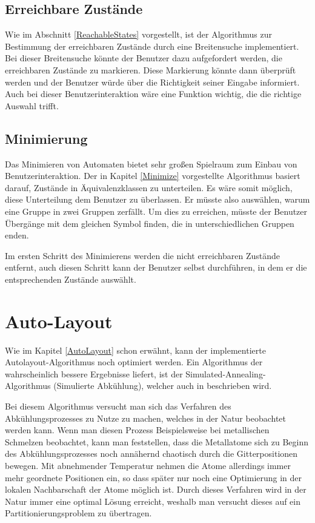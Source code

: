 \subsection{Erreichbare Zustände}\label{PerspectiveReachableStates}
Wie im Abschnitt \ref{ReachableStates} vorgestellt, ist der Algorithmus zur
Bestimmung der erreichbaren Zustände durch eine Breitensuche implementiert. Bei
dieser Breitensuche könnte der Benutzer dazu aufgefordert werden, die
erreichbaren Zustände zu markieren. Diese Markierung könnte dann überprüft werden
und der Benutzer würde über die Richtigkeit seiner Eingabe informiert. Auch bei
dieser Benutzerinteraktion wäre eine Funktion wichtig, die die richtige Auswahl
trifft.\vspace{10pt}


\subsection{Minimierung}\label{PerspectiveMinimize}
Das Minimieren von Automaten bietet sehr großen Spielraum zum Einbau von
Benutzerinteraktion. Der in Kapitel \ref{Minimize} vorgestellte Algorithmus
basiert darauf, Zustände in Äquivalenz\-klassen zu unterteilen. Es wäre somit
möglich, diese Unterteilung dem Benutzer zu überlassen. Er müsste also
auswählen, warum eine Gruppe in zwei Gruppen zerfällt. Um dies zu erreichen,
müsste der Benutzer Übergänge mit dem gleichen Symbol finden, die in
unterschiedlichen Gruppen enden.\vspace{10pt}

Im ersten Schritt des Minimierens werden die nicht erreichbaren Zustände
entfernt, auch diesen Schritt kann der Benutzer selbst durchführen, in dem er die
entsprechenden Zustände auswählt.\vspace{10pt}


\section{Auto-Layout}\label{PerspectiveAutoLayout}

Wie im Kapitel \ref{AutoLayout} schon erwähnt, kann der implementierte
Autolayout-Algorithmus noch optimiert werden. Ein Algorithmus der wahrscheinlich
bessere Ergebnisse liefert, ist der Simulated-Annealing-Algorithmus (Simulierte
Abkühlung), welcher auch in \cite{Layout} beschrieben wird.\vspace{10pt}

Bei diesem Algorithmus versucht man sich das Verfahren des Ab\-kühlungs\-pro\-zes\-ses zu
Nutze zu machen, welches in der Natur beobachtet werden kann. Wenn man diesen
Prozess Beispielsweise bei metallischen Schmelzen beobachtet, kann man
feststellen, dass die Metallatome sich zu Beginn des Ab\-kühlungs\-pro\-zes\-ses noch
annähernd chaotisch durch die Gitterpositionen bewegen. Mit abnehmender
Temperatur nehmen die Atome allerdings immer mehr geordnete Positionen ein, so
dass später nur noch eine Optimierung in der lokalen Nachbarschaft der Atome
möglich ist. Durch dieses Verfahren wird in der Natur immer eine
optimal Lösung erreicht, weshalb man versucht dieses auf ein
Partitionierungsproblem zu übertragen.\vspace{10pt}

